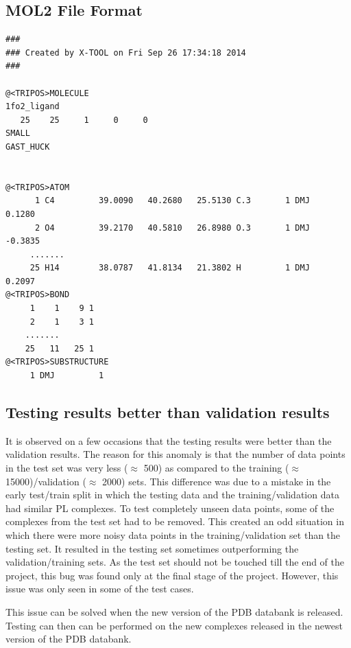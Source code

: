 \documentclass[11pt]{article}
\begin{document}
\subsection{MOL2 File Format}
\label{MOL2Fileexampleref}
\begin{verbatim}
### 
### Created by X-TOOL on Fri Sep 26 17:34:18 2014
### 

@<TRIPOS>MOLECULE
1fo2_ligand
   25    25     1     0     0
SMALL
GAST_HUCK


@<TRIPOS>ATOM
      1 C4         39.0090   40.2680   25.5130 C.3       1 DMJ         0.1280
      2 O4         39.2170   40.5810   26.8980 O.3       1 DMJ        -0.3835
     .......
     25 H14        38.0787   41.8134   21.3802 H         1 DMJ         0.2097
@<TRIPOS>BOND
     1    1    9 1  
     2    1    3 1  
    .......
    25   11   25 1  
@<TRIPOS>SUBSTRUCTURE
     1 DMJ         1
\end{verbatim}

\subsection{Testing results better than validation results}
\label{testingissuesection}
It is observed on a few occasions that the testing results were better than the validation results. The reason for this anomaly is that the number of data points in the test set was very less ($\approx$ 500) as compared to the training ($\approx$ 15000)/validation ($\approx$ 2000) sets. This difference was due to a mistake in the early test/train split in which the testing data and the training/validation data had similar PL complexes. To test completely unseen data points, some of the complexes from the test set had to be removed. This created an odd situation in which there were more noisy data points in the training/validation set than the testing set. It resulted in the testing set sometimes outperforming the validation/training sets. As the test set should not be touched till the end of the project, this bug was found only at the final stage of the project.
However, this issue was only seen in some of the test cases.

This issue can be solved when the new version of the PDB databank is released. Testing can then can be performed on the new complexes released in the newest version of the PDB databank.
\end{document}
